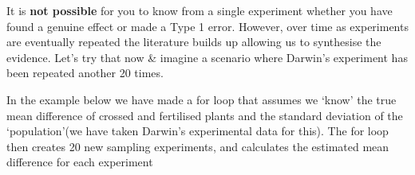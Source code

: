 \documentclass[
]{book}
\newenvironment{Shaded}{\begin{snugshade}}{\end{snugshade}}
\newcommand{\AttributeTok}[1]{\textcolor[rgb]{0.77,0.63,0.00}{#1}}
\newcommand{\CommentTok}[1]{\textcolor[rgb]{0.56,0.35,0.01}{\textit{#1}}}
\newcommand{\ControlFlowTok}[1]{\textcolor[rgb]{0.13,0.29,0.53}{\textbf{#1}}}
\newcommand{\DecValTok}[1]{\textcolor[rgb]{0.00,0.00,0.81}{#1}}
\newcommand{\FloatTok}[1]{\textcolor[rgb]{0.00,0.00,0.81}{#1}}
\newcommand{\FunctionTok}[1]{\textcolor[rgb]{0.00,0.00,0.00}{#1}}
\newcommand{\NormalTok}[1]{#1}
\newcommand{\OtherTok}[1]{\textcolor[rgb]{0.56,0.35,0.01}{#1}}
\newcommand{\SpecialCharTok}[1]{\textcolor[rgb]{0.00,0.00,0.00}{#1}}
\newcommand{\StringTok}[1]{\textcolor[rgb]{0.31,0.60,0.02}{#1}}
\begin{document}
It is \textbf{not possible} for you to know from a single experiment whether you have found a genuine effect or made a Type 1 error. However, over time as experiments are eventually repeated the literature builds up allowing us to synthesise the evidence. Let's try that now \& imagine a scenario where Darwin's experiment has been repeated another 20 times.

In the example below we have made a for loop that assumes we `know' the true mean difference of crossed and fertilised plants and the standard deviation of the `population'(we have taken Darwin's experimental data for this). The for loop then creates 20 new sampling experiments, and calculates the estimated mean difference for each experiment

\begin{Shaded}
\end{Shaded}
\end{document}
